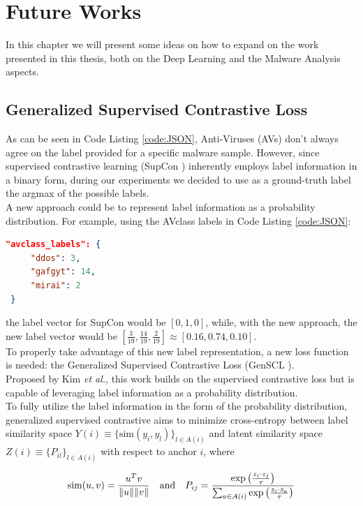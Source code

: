 \chapter{Future Works}
\thispagestyle{chapterfancy}

In this chapter we will present some ideas on how to expand on the work presented in this thesis, both on the Deep Learning and the Malware Analysis aspects.

\section{Generalized Supervised Contrastive Loss}
As can be seen in Code Listing \ref{code:JSON}, Anti-Viruses (AVs) don't always agree on the label provided for a specific malware sample. However, since supervised contrastive learning (SupCon \cite{khosla2020supervised}) inherently employs label information in a binary form, during our experiments we decided to use as a ground-truth label the argmax of the possible labels. \\
A new approach could be to represent label information as a probability distribution. For example, using the AVclass labels in Code Listing \ref{code:JSON}:

\begin{lstlisting}[language=json, xrightmargin=.675\textwidth]
 "avclass_labels": {
     "ddos": 3,
     "gafgyt": 14,
     "mirai": 2
 }
\end{lstlisting}

\noindent the label vector for SupCon would be $[0,1,0]$, while, with the new approach, the new label vector would be $\left[\frac{3}{19},\frac{14}{19},\frac{2}{19}\right]\approx[0.16,0.74,0.10]$. \\
To properly take advantage of this new  label representation, a new loss function is needed: the Generalized Supervised Contrastive Loss (GenSCL \cite{kim2022generalized}). \\
Proposed by Kim \textit{et al.}, this work builds on the supervised contrastive loss but is capable of leveraging label information as a probability distribution. \\
To fully utilize the label information in the form of the probability distribution, generalized supervised contrastive aims to minimize cross-entropy between label similarity space $Y(i)\equiv\{\text{sim}(y_{i},y_{l})\}_{l\in A(i)}$ and latent similarity space $Z(i)\equiv\{P_{il}\}_{l\in A(i)}$ with respect to anchor $i$, where

\begin{equation}
\text{sim}(u,v) = \frac{u^{T}v}{\norm{u}\norm{v}} \quad\text{and}\quad P_{ij}=\frac{\exp \left(\frac{z_{i} \cdot z_{j}}{\tau}\right)}{\sum_{a\in A(i)} \exp \left(\frac{z_{i} \cdot z_{a}}{\tau}\right)} 
\end{equation}

